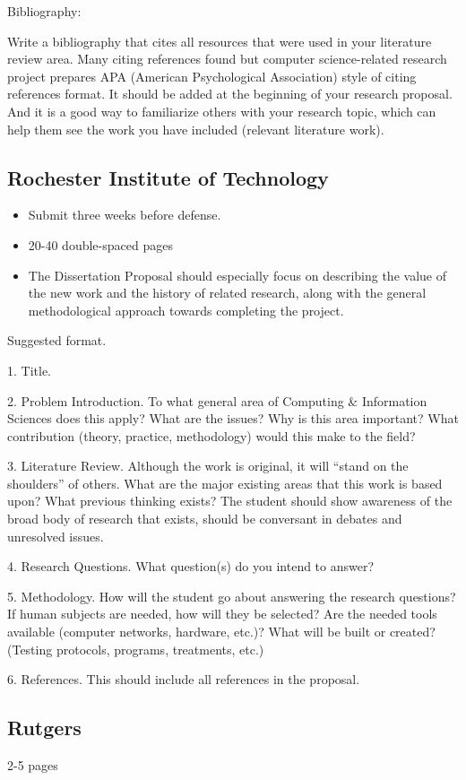 Bibliography:

Write a bibliography that cites all resources that were used in your literature review area. Many citing references found but computer science-related research project prepares APA (American Psychological Association) style of citing references format. It should be added at the beginning of your research proposal.  And it is a good way to familiarize others with your research topic, which can help them see the work you have included (relevant literature work).

\subsection{Rochester Institute of Technology}

\begin{itemize}
	\item Submit three weeks before defense.  
	\item 20-40 double-spaced pages
	\item The Dissertation Proposal should especially focus on describing the value of the new work and the history of related research, along with the general methodological approach towards completing the project.
\end{itemize}

Suggested format.

1. Title.

2. Problem Introduction. To what general area of Computing \& Information Sciences does
this apply? What are the issues? Why is this area important? What contribution (theory,
practice, methodology) would this make to the field?

3. Literature Review. Although the work is original, it will “stand on the shoulders” of others.
What are the major existing areas that this work is based upon? What previous thinking exists? The student should show awareness of the broad body of research that exists, should be conversant in debates and unresolved issues.

4. Research Questions. What question(s) do you intend to answer?

5. Methodology. How will the student go about answering the research questions? If human
subjects are needed, how will they be selected? Are the needed tools available (computer networks, hardware, etc.)? What will be built or created? (Testing protocols, programs, treatments, etc.)

6. References. This should include all references in the proposal.

\subsection{Rutgers}

2-5 pages

